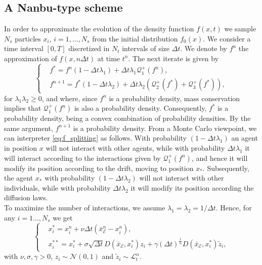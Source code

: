 \documentclass[11pt,handout]{article}%
\numberwithin{equation}{section}
\theoremstyle{definition}
\begin{document}
\subsection{A Nanbu-type scheme}
In order to approximate the evolution of the density function $f(x,t)$ we sample $N_s$ particles $x_i$, $i=1,\ldots,N_s$ from the initial distribution $f_0(x)$. We consider a time interval $[0,T]$ discretized in $N_t$ intervals of size $\Delta t$. We denote by $f^n$ the approximation of $f(x,n\Delta t)$ at time $t^n$. The next iterate is given by 
\begin{equation}\label{eq:f_splitting}
	\begin{cases}
		&f^* = f^n (1-\Delta t \lambda_1) + \Delta t \lambda_1 \mathcal{Q}_1^{+}(f^n),\\
		&f^{n+1} = f^* (1-\Delta t \lambda_2) + \Delta t \lambda_2 (\mathcal{Q}_2^{+}(f^*)+\mathcal{Q}_3^{+}(f^*)), 
	\end{cases}
\end{equation}
for $\lambda_1 \lambda_2 \geq 0$, and  
where, since $f^n$ is a probability density, mass conservation implies that
$\mathcal{Q}_1^{+}(f^n)$ is also a probability density. Consequently,
$f^*$ is a probability density, being a convex combination of probability densities. By the same argument, $f^{n+1}$ is a probability density. 
From a Monte Carlo viewpoint, we can interpreter \eqref{eq:f_splitting} as follows. With probability $(1-\Delta t \lambda_1)$ an agent in position $x$ will not interact with other agents, while with probability $\Delta t \lambda_1$ it will interact according to the interactions given by $\mathcal{Q}_1^+(f^n)$, and hence it will modify its position according to the drift, moving to position $x_*$. Subsequently, the agent $x_*$ with probability $(1-\Delta t \lambda_2)$ will not interact with other individuals, while with probability $\Delta t \lambda_2$ it will modify its position according the diffusion laws.  \\ To maximize the number of interactions, we assume $\lambda_1=\lambda_2 = 1/\Delta t$. Hence, for any $i=1\ldots,N_s$ we get
\begin{equation}\label{eq:binary_rules}
	\begin{cases}
		&x_i^* = x_i^n + \nu \Delta t (\bar{x}_\mathcal{E}^n - x_i^n),\\
		&x_i^{**} = x_i^* + \sigma \sqrt{\Delta t} D(\bar{x}_\mathcal{E},x_i^*) z_i+ \gamma (\Delta t)^{\frac{1}{\alpha}} D(\bar{x}_\mathcal{E},x_i^{*}) \tilde{z}_i, 
	\end{cases}
\end{equation}
with $\nu,\sigma,\gamma >0$, $z_i\sim \mathcal{N}(0,1)$ and $\tilde{z}_i\sim \mathcal{L}_t^\alpha$. 
\end{document}
